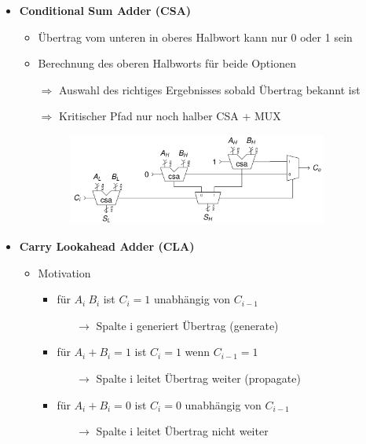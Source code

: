 \documentclass[11pt,a4paper]{article}
\begin{document}
\begin{itemize}
\item \textbf{Conditional Sum Adder (CSA)}
	\begin{itemize}
	\item Übertrag vom unteren in oberes Halbwort kann nur 0 oder 1 sein
	\item Berechnung des oberen Halbworts für beide Optionen
	\item[$\Rightarrow$] Auswahl des richtiges Ergebnisses sobald Übertrag bekannt ist
	\item[$\Rightarrow$] Kritischer Pfad nur noch halber CSA + MUX
	\item[]
			\begin{figure}[H]
				\begin{center}
				\includegraphics[height=3cm]{Bilder/csa1}
				\end{center}
			\end{figure}
	\end{itemize}

\item \textbf{Carry Lookahead Adder (CLA)}
	\begin{itemize}
	\item Motivation	
		\begin{itemize}
		\item für $A_i~B_i$ ist $C_i = 1$ unabhängig von $C_{i-1}$
			\begin{itemize}
			\item[$\rightarrow$] Spalte i generiert Übertrag (generate)
			\end{itemize}
		\item für $A_i+B_i = 1$ ist $C_i = 1$ wenn $C_{i-1} = 1$
			\begin{itemize}
			\item[$\rightarrow$] Spalte  i leitet Übertrag weiter (propagate)
			\end{itemize}
		\item für $A_i + B_i = 0$ ist $C_i = 0$ unabhängig von $C_{i-1}$
			\begin{itemize}
			\item[$\rightarrow$] Spalte i leitet Übertrag nicht weiter
			\end{itemize}
		\end{itemize}
		

\end{itemize}
\end{itemize}
\end{document}

